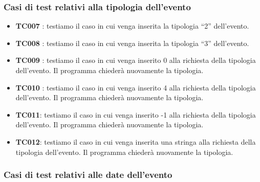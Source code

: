 \documentclass[11pt]{scrartcl} %
\begin{document}
\subsubsection{Casi di test relativi alla tipologia dell'evento}

\begin{itemize}


	\item \textbf{TC007} : testiamo il caso in cui venga inserita la tipologia “2” dell’evento.

	\item \textbf{TC008} : testiamo il caso in cui venga inserita la tipologia “3” dell’evento.

	\item \textbf{TC009} : testiamo il caso in cui venga inserito 0 alla richiesta della tipologia dell’evento. Il programma chiederà nuovamente la tipologia.

	\item \textbf{TC010} : testiamo il caso in cui venga inserito 4 alla richiesta della tipologia dell’evento. Il programma chiederà nuovamente la tipologia.

	\item \textbf{TC011}: testiamo il caso in cui venga inserito -1 alla richiesta della tipologia dell’evento. Il programma chiederà nuovamente la tipologia.

	\item \textbf{TC012}: testiamo il caso in cui venga inserita una stringa alla richiesta della tipologia dell’evento. Il programma chiederà nuovamente la tipologia.


\end{itemize}


\subsubsection{Casi di test relativi alle date dell'evento}
\end{document}
